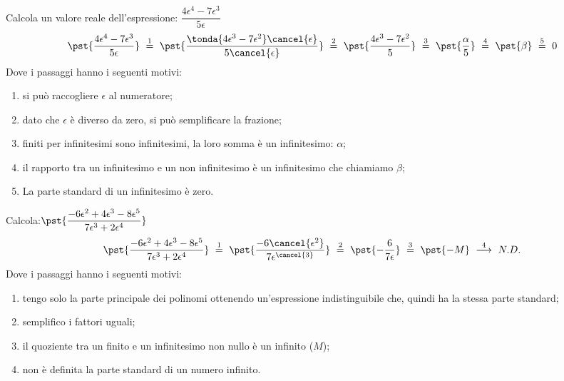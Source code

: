 \begin{esempio}
Calcola un valore reale dell'espressione: \quad
\(\dfrac{4 \epsilon^4 -7 \epsilon^3}{5 \epsilon}\)
\[\pst{\dfrac{4 \epsilon^4 -7 \epsilon^3}{5 \epsilon}} 
~ \stackrel{1}{=} ~
  \pst{\dfrac{\tonda{4 \epsilon^3 -7 \epsilon^2} \cancel{\epsilon}}
                    {5 \cancel{\epsilon}}} 
~ \stackrel{2}{=} ~ 
  \pst{\dfrac{4 \epsilon^3 -7 \epsilon^2}{5}}
~ \stackrel{3}{=} ~
  \pst{\dfrac{\alpha}{5}}
~ \stackrel{4}{=} ~
  \pst{\beta}
~ \stackrel{5}{=} ~
  0\]
Dove i passaggi hanno i seguenti motivi:
\begin{enumerate} [nosep]
 \item si può raccogliere \(\epsilon\) al numeratore; 
 \item dato che \(\epsilon\) è diverso da zero, si può semplificare la 
frazione; 
 \item finiti per infinitesimi sono infinitesimi, la loro
somma è un infinitesimo: \(\alpha\);
 \item il rapporto tra un infinitesimo e un non infinitesimo è un 
infinitesimo che chiamiamo \(\beta\);
 \item La parte standard di un infinitesimo è zero. 
\end{enumerate}
\end{esempio}

\begin{esempio}
Calcola:\quad \(\pst{\dfrac{-6\epsilon^2 +4 \epsilon^3 -8 \epsilon^5}
             {7\epsilon^3 + 2 \epsilon^4}}\)
\[\pst{\dfrac{-6\epsilon^2 +4 \epsilon^3 -8 \epsilon^5}
             {7\epsilon^3 + 2 \epsilon^4}} 
~ \stackrel{1}{=} ~
  \pst{\dfrac{-6\cancel{\epsilon^2}}
             {7\epsilon^{\cancel{3}}}} 
~ \stackrel{2}{=} ~
  \pst{-\dfrac{6}{7\epsilon}}  
~ \stackrel{3}{=} ~
  \pst{-M} 
~ \stackrel{4}{\longrightarrow} ~
  N.D.\]
Dove i passaggi hanno i seguenti motivi:
\begin{enumerate} [nosep]
 \item tengo solo la parte principale dei polinomi ottenendo un'espressione 
indistinguibile che, quindi ha la stessa parte standard;
 \item semplifico i fattori uguali;
 \item il quoziente tra un finito e un infinitesimo non nullo è un 
infinito (\(M\));
 \item non è definita la parte standard di un numero infinito.
\end{enumerate}
\begin{osservazione}
\end{osservazione}
\end{esempio}


